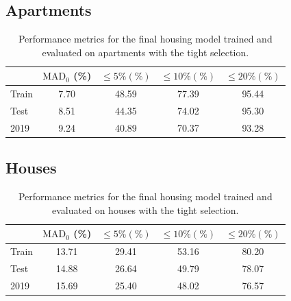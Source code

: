 \subsection*{Apartments}
\begin{table}
  \centerfloat
  \begin{tabular}{@{}lcccc@{}}
    {} &      $\mathrm{MAD}_0$ (\%) & $\leq 5\% (\%)$ &  $\leq 10\% (\%)$ &   $\leq 20\% (\%)$               \\
    \midrule
    Train & \num{7.70} & \num{48.59} & \num{77.39} & \num{95.44} \\
    Test  & \num{8.51} & \num{44.35} & \num{74.02} & \num{95.30} \\
    2019  & \num{9.24} & \num{40.89} & \num{70.37} & \num{93.28} \\
    \end{tabular}
  \vspace{\abovecaptionskip}
  \caption[Performance Metrics for Apartments with the Tight Selection]{Performance metrics for the final housing model trained and evaluated on apartments with the tight selection.}
  \label{tab:h:results_ejer_tight}
\end{table}

\FloatBarrier
\subsection*{Houses}
\begin{table}
  \centerfloat
  \begin{tabular}{@{}lcccc@{}}
    {} &      $\mathrm{MAD}_0$ (\%) & $\leq 5\% (\%)$ &  $\leq 10\% (\%)$ &   $\leq 20\% (\%)$              \\
    \midrule
    Train & \num{13.71} & \num{29.41} & \num{53.16} & \num{80.20} \\
    Test  & \num{14.88} & \num{26.64} & \num{49.79} & \num{78.07} \\
    2019  & \num{15.69} & \num{25.40} & \num{48.02} & \num{76.57}
    \end{tabular}
  \vspace{\abovecaptionskip}
  \caption[Performance Metrics for Houses with the Tight Selection]{Performance metrics for the final housing model trained and evaluated on houses with the tight selection.}
  \label{tab:h:results_villa_tight}
\end{table}



